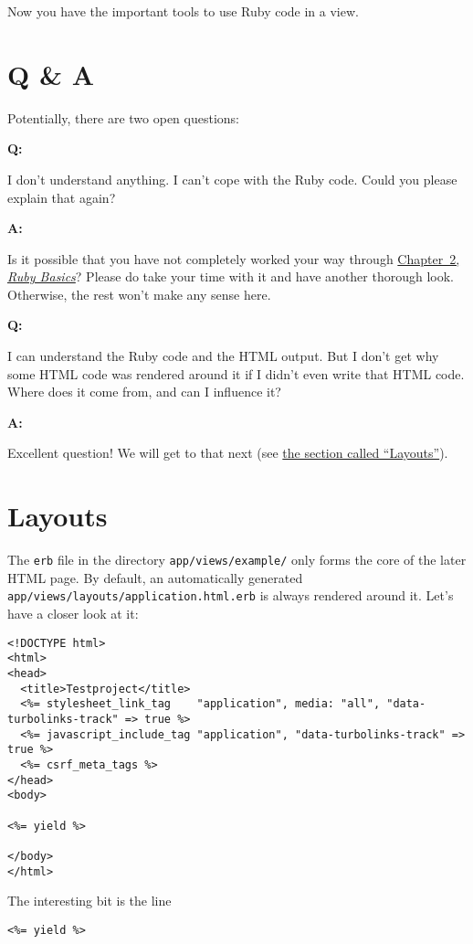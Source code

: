 \documentclass[a4paper]{book}
\newcommand{\chap}[1]{\newpage\thispagestyle{empty}\chapter{#1}\label{chap:\thechapter}}
\begin{document}
Now you have the important tools to use Ruby code in a view.

\chap{Q \& A}\label{q-a}

Potentially, there are two open questions:

\textbf{Q:}

I don't understand anything. I can't cope with the Ruby code. Could you please explain that again?

\textbf{A:}

Is it possible that you have not completely worked your way through \hyperref[ruby-grundlagen]{Chapter~2, \emph{Ruby Basics}}? Please do take your time with it and have another thorough look. Otherwise, the rest won't make any sense here.

\textbf{Q:}

I can understand the Ruby code and the HTML output. But I don't get why some HTML code was rendered around it if I didn't even write that HTML code. Where does it come from, and can I influence it?

\textbf{A:}

Excellent question! We will get to that next (see \hyperref[erbux5flayouts]{the section called “Layouts”}).

\chap{Layouts}\label{layouts}

The \texttt{erb} file in the directory \texttt{app/views/example/} only forms the core of the later HTML page. By default, an automatically generated \texttt{app/views/layouts/application.html.erb} is always rendered around it. Let's have a closer look at it:

\begin{shaded}\begin{verbatim}
<!DOCTYPE html>
<html>
<head>
  <title>Testproject</title>
  <%= stylesheet_link_tag    "application", media: "all", "data-turbolinks-track" => true %>
  <%= javascript_include_tag "application", "data-turbolinks-track" => true %>
  <%= csrf_meta_tags %>
</head>
<body>

<%= yield %>

</body>
</html>
\end{verbatim}\end{shaded}

The interesting bit is the line

\begin{shaded}\begin{verbatim}
<%= yield %>
\end{verbatim}\end{shaded}
\end{document}
